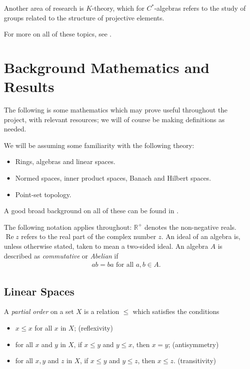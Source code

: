 \documentclass[11pt,a4paper]{report}
\theoremstyle{plain}
\theoremstyle{definition}
\newcommand{\1}{\mathbbm{1}}
\newcommand{\R}{\mathbb{R}}
\DeclareMathOperator{\Real}{\operatorname{Re}}
\begin{document}
Another area of research is $K$-theory, which for $C^\ast$-algebras refers to 
the study of groups related to the structure of projective elements. 

For more on all of these topics, see \cite{davidson96,dixmier81,sakai71}.




\chapter{Background Mathematics and Results} 
The following is some mathematics which may prove useful throughout the project, 
with relevant resources; we will of course be making definitions as needed.

	
We will be assuming some familiarity with the following theory:
\begin{itemize}
	\item Rings, algebras and linear spaces.
	\item Normed spaces, inner product spaces, Banach and Hilbert spaces.
	\item Point-set topology.
\end{itemize}
A good broad background on all of these can be found in \cite{rudin91,simmons83}.


	
The following notation applies throughout: $\R^+$ denotes the non-negative 
reals. $\Real z$ refers to the real part of the complex number $z$. An ideal of 
an algebra is, unless otherwise stated, taken to mean a two-sided ideal. An 
algebra $A$ is described as \emph{commutative} or \emph{Abelian} if
\begin{align*}
	ab = ba \mbox{ for all } a,b\in A.
\end{align*}

\section{Linear Spaces}

A \emph{partial order} on a set $X$ is a relation $\leq$ which satisfies the 
conditions
\begin{itemize}
	\item $x \leq x$ for all $x$ in $X$; 		\hfill (reflexivity)
	\item for all $x$ and $y$ in $X$, if $x \leq y$ and $y\leq x$, then $x=y$; 
												\hfill (antisymmetry)
	\item for all $x,y$ and $z$ in $X$, if $x \leq y$ and $y\leq z$, then $x\leq z$. 
												\hfill (transitivity)
\end{itemize}
\end{document}
